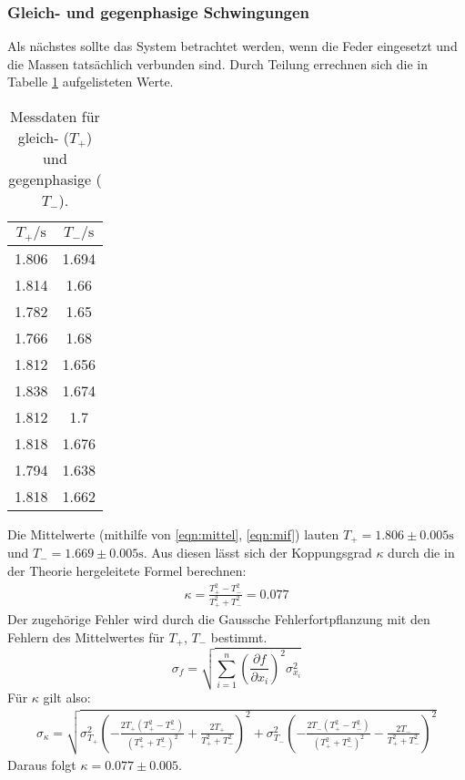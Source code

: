\subsubsection{Gleich- und gegenphasige Schwingungen}
Als nächstes sollte das System betrachtet werden, wenn die Feder eingesetzt und die Massen tatsächlich verbunden sind.
Durch Teilung errechnen sich die in Tabelle \ref{tab:g1} aufgelisteten Werte. 
\begin{table}
    \centering
    \caption{Messdaten für gleich- ($T_{+}$) und gegenphasige ($T_{-}$).}
    \label{tab:g1}
    \begin{tabular}{c c}
     \toprule
     $T_{+} / \si{\s}$ & $T_{-} / \si{\s}$\\
     \midrule
     1.806 & 1.694 \\
     1.814 & 1.66 \\
     1.782 & 1.65 \\
     1.766 & 1.68 \\
     1.812 & 1.656 \\
     1.838 & 1.674 \\
     1.812 & 1.7\\
     1.818 & 1.676\\
     1.794 & 1.638 \\
     1.818 & 1.662 \\
     \bottomrule
    \end{tabular}
\end{table}
Die Mittelwerte (mithilfe von \eqref{eqn:mittel}, \eqref{eqn:mif}) lauten $T_{+} = 1.806\pm 0.005\si{\s}$ und $T_{-} = 1.669\pm 0.005\si{\s}$. Aus diesen lässt sich der Koppungsgrad $\kappa$ durch die in der 
Theorie hergeleitete Formel berechnen:
\begin{align*}
\kappa = \frac{T_{+}^2 - T_{-}^2}{T_{+}^2 + T_{-}^2}
    = 0.077
\end{align*}
Der zugehörige Fehler wird durch die Gaussche Fehlerfortpflanzung mit den Fehlern des Mittelwertes für $T_{+}$, $T_{-}$ bestimmt.
\begin{equation}
\sigma_f = \sqrt{\sum_{i=1}^{n} \left( \frac{\partial f}{\partial x_i} \right)^2 \sigma_{x_i}^2}
\label{eqn:gauss}
\end{equation}
Für $\kappa$ gilt also:
\begin{align}
\sigma_{\kappa} = \sqrt{\sigma_{T_{+}}^{2} \left(- \frac{2 T_{+} \left(T_{+}^{2} - T_{-}^{2}\right)}{\left(T_{+}^{2} + T_{-}^{2}\right)^{2}} + \frac{2 T_{+}}{T_{+}^{2} + T_{-}^{2}}\right)^{2} + \sigma_{T_{-}}^{2} \left(- \frac{2 T_{-} \left(T_{+}^{2} - T_{-}^{2}\right)}{\left(T_{+}^{2} + T_{-}^{2}\right)^{2}} - \frac{2 T_{-}}{T_{+}^{2} + T_{-}^{2}}\right)^{2}}
\end{align}
Daraus folgt $\kappa = 0.077 \pm 0.005$.

